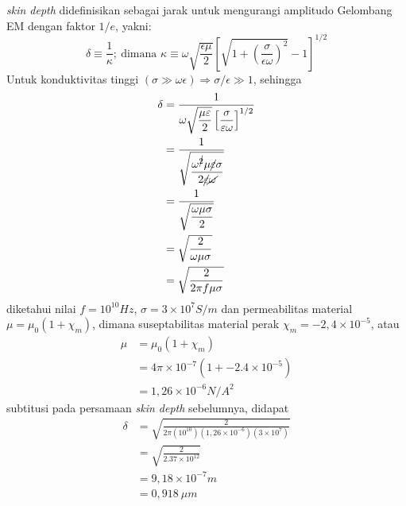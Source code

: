 \textit{skin depth} didefinisikan sebagai jarak untuk mengurangi amplitudo Gelombang EM dengan faktor $1/e$, yakni:
\begin{equation*}
    \delta \equiv \frac{1}{\kappa};\ \text{dimana } \kappa \equiv \omega \sqrt{\frac{\epsilon\mu}{2}} \left[\sqrt{1+\left(\frac{\sigma}{\epsilon\omega}\right)^2}-1\right]^{1/2}
\end{equation*}
Untuk konduktivitas tinggi $(\sigma \gg \omega \epsilon) \Rightarrow \sigma/\epsilon \gg 1$, sehingga
\begin{align*}
    \delta &= \frac{1}{
        \omega \sqrt{\dfrac{\mu \epsilon}{2}} \left[\dfrac{\sigma}{\epsilon\omega}\right]^{1/2}
    }\\
    &=\frac{1}{\sqrt{\dfrac{\omega^{\cancel{2}} \mu \cancel{\epsilon}\sigma}{2\cancel{\epsilon}\cancel{\omega}}}}\\
    &=\frac{1}{\sqrt{\dfrac{\omega\mu\sigma}{2}}}\\
    &=\sqrt{\frac{2}{\omega\mu\sigma}}\\
    &= \sqrt{\frac{2}{2\pi f \mu \sigma}}
\end{align*}
diketahui nilai $f=10^{10}\si{Hz}$, $\sigma=3\times 10^7 \si{S/m}$ dan permeabilitas material $\mu=\mu_0(1+\chi_m)$, dimana suseptabilitas material perak $\chi_m=-2,4\times 10^{-5}$, atau
\begin{align*}
    \mu&=\mu_0(1+\chi_m)\\
    &=4\pi\times 10^{-7}(1+-2.4\times 10^{-5})\\
    &=1,26 \times 10^{-6}\si{N/A^2}
\end{align*}
subtitusi pada persamaan \textit{skin depth} sebelumnya, didapat
\begin{align*}
    \delta&= \sqrt{\frac{2}{2\pi (10^{10}) (1,26 \times 10^{-6}) (3\times 10^7)}}\\
    &= \sqrt{\frac{2}{2.37\times 10^{12}}}\\
    &=9,18 \times 10^{-7} \si{m}\\
    &=0,918\ \si{\mu m} 
\end{align*}